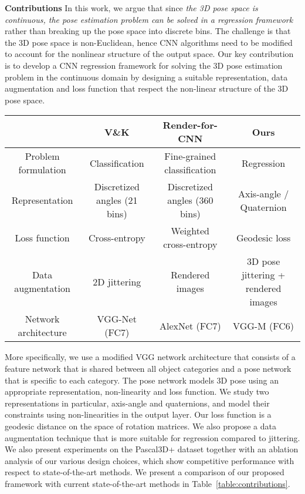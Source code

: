 \documentclass[10pt,twocolumn,letterpaper]{article}
\newcommand{\myparagraph}[1]{\smallskip\noindent\textbf{#1}}
\begin{document}
	\myparagraph{Contributions} In this work, we argue that since \textit{the 3D pose space is continuous, the pose estimation problem can be solved in a regression framework} rather than breaking up the pose space into discrete bins. The challenge is that the 3D pose space is non-Euclidean, hence CNN algorithms need to be modified to account for the nonlinear structure of the output space. Our key contribution is to develop a CNN regression framework for solving the 3D pose estimation problem in the continuous domain by designing a suitable representation, data augmentation and loss function that respect the non-linear structure of the 3D pose space.
	
	\begin{table*}[ht]
		\centering
		\begin{tabular}{|c|c|c|c|}
			\hline
			& V\&K \cite{Tulsiani:CVPR15} & Render-for-CNN \cite{Su:ICCV15} & Ours \\
			\hline
			Problem formulation & Classification & Fine-grained classification & Regression \\
			\hline
			Representation & Discretized angles (21 bins) & Discretized angles (360 bins) & Axis-angle / Quaternion \\
			\hline
			Loss function & Cross-entropy & Weighted cross-entropy & Geodesic loss \\
			\hline
			Data augmentation & 2D jittering & Rendered images &3D pose jittering + rendered images \\
			\hline
			Network architecture & VGG-Net (FC7) & AlexNet (FC7) & VGG-M (FC6) \\
			\hline
		\end{tabular}
		\caption{A comparison of the state-of-the-art methods and our proposed framework}
		\label{table:contributions}
	\end{table*}

	 More specifically, we use a modified VGG network architecture that consists of a feature network that is shared between all object categories and a pose network that is specific to each category. The pose network models 3D pose using an appropriate representation, non-linearity and loss function. We study two representations in particular, axis-angle and quaternions, and model their constraints using non-linearities in the output layer. Our loss function is a geodesic distance on the space of rotation matrices. We also propose a data augmentation technique that is more suitable for regression compared to jittering. We also present experiments on the Pascal3D+ dataset together with an ablation analysis of our various design choices, which show competitive performance with respect to state-of-the-art methods. We present a comparison of our proposed framework with current state-of-the-art methods in Table~\ref{table:contributions}.
	
\end{document}
